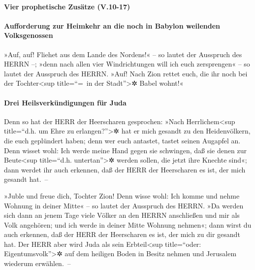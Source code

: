 \hypertarget{vier-prophetische-zusuxe4tze-v.10-17}{%
\paragraph{Vier prophetische Zusätze
(V.10-17)}\label{vier-prophetische-zusuxe4tze-v.10-17}}

\hypertarget{aufforderung-zur-heimkehr-an-die-noch-in-babylon-weilenden-volksgenossen}{%
\paragraph{Aufforderung zur Heimkehr an die noch in Babylon weilenden
Volksgenossen}\label{aufforderung-zur-heimkehr-an-die-noch-in-babylon-weilenden-volksgenossen}}

 »Auf, auf! Fliehet aus dem Lande des Nordens!« -- so
lautet der Ausspruch des HERRN --; »denn nach allen vier Windrichtungen
will ich euch zersprengen« -- so lautet der Ausspruch des HERRN.
 »Auf! Nach Zion rettet euch, die ihr noch bei der
Tochter\textless sup title=``=~in der Stadt''\textgreater✲ Babel wohnt!«

\hypertarget{drei-heilsverkuxfcndigungen-fuxfcr-juda}{%
\paragraph{Drei Heilsverkündigungen für
Juda}\label{drei-heilsverkuxfcndigungen-fuxfcr-juda}}

 Denn so hat der HERR der Heerscharen gesprochen: »Nach
Herrlichem\textless sup title=``d.h. um Ehre zu erlangen?''\textgreater✲
hat er mich gesandt zu den Heidenvölkern, die euch geplündert haben;
denn wer euch antastet, tastet seinen Augapfel an.  Denn
wisset wohl: Ich werde meine Hand gegen sie schwingen, daß sie denen zur
Beute\textless sup title=``d.h. untertan''\textgreater✲ werden sollen,
die jetzt ihre Knechte sind«; dann werdet ihr auch erkennen, daß der
HERR der Heerscharen es ist, der mich gesandt hat.~--

 »Juble und freue dich, Tochter Zion! Denn wisse wohl:
Ich komme und nehme Wohnung in deiner Mitte« -- so lautet der Ausspruch
des HERRN.  »Da werden sich dann an jenem Tage viele
Völker an den HERRN anschließen und mir als Volk angehören; und ich
werde in deiner Mitte Wohnung nehmen«; dann wirst du auch erkennen, daß
der HERR der Heerscharen es ist, der mich zu dir gesandt hat.
 Der HERR aber wird Juda als sein Erbteil\textless sup
title=``oder: Eigentumsvolk''\textgreater✲ auf dem heiligen Boden in
Besitz nehmen und Jerusalem wiederum erwählen.~--

